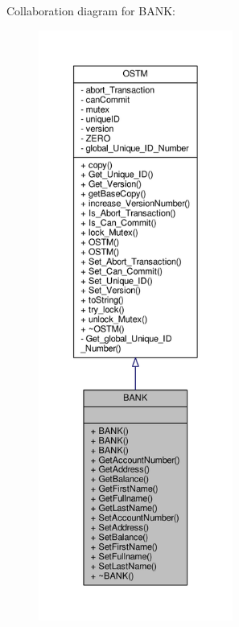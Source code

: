 Collaboration diagram for B\+A\+NK\+:
\nopagebreak
\begin{figure}[H]
\begin{center}
\leavevmode
\includegraphics[height=550pt]{class_b_a_n_k__coll__graph}
\end{center}
\end{figure}
